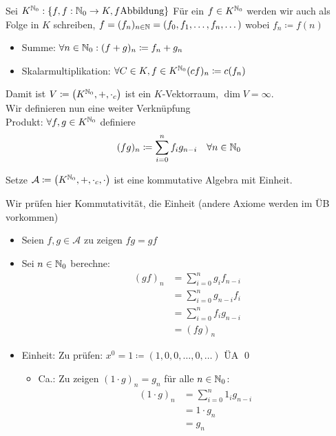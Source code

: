 \begin{subexample}
	Sei $ K^{\mathbb{N} _0} : \left\{ f, f : \mathbb{N} _0 \to K, f \text{Abbildung}  \right\}  $ 
	Für ein $ f \in K^{\mathbb{N} _0}  $ werden wir auch als Folge in $ K $ schreiben, $ f = (f_n)_{n \in \mathbb{N} } = (f_0, f_1, \dotsc, f_n, \dotsc) $ wobei $ f_n \coloneqq f(n) $
	\begin{itemize}
		\item Summe: $ \forall n \in \mathbb{N} _0 : (f + g)_n \coloneqq f_n + g_n $ 
		\item Skalarmultiplikation: $ \forall C \in K, f \in K^{\mathbb{N} _0} (cf)_n \coloneqq c(f_n) $ 
	\end{itemize}
	Damit ist $ V \coloneqq \left(K^{\mathbb{N} _0} , + , \cdot _c\right) $ ist ein $ K $-Vektorraum, $ \dim V = \infty $.\\
	Wir definieren nun eine weiter Verknüpfung\\
	Produkt: $ \forall f, g \in K^{\mathbb{N} _0}  $ definiere
	\[
		(fg)_n \coloneqq  \sum_{i=0}^{n} f_i g_{n - i} \quad \forall n \in \mathbb{N} _0
	\]
\end{subexample}

\begin{subproposition}
	Setze $ \mathcal{A} \coloneqq \left( K^{\mathbb{N} _0} , + , \cdot _c, \cdot  \right)  $ ist eine kommutative Algebra mit Einheit.
\end{subproposition}
\begin{subproof*}
	Wir prüfen hier Kommutativität, die Einheit (andere Axiome werden im ÜB vorkommen)
	\begin{itemize}
		\item Seien $ f, g \in \mathcal{A}  $ zu zeigen $ fg = gf $ 
		\item Sei $ n \in \mathbb{N} _0 $ berechne:
			\begin{align*}
				(gf)_n &= \sum_{i=0}^{n} g_i f_{n - i}  \\
				       &= \sum_{i=0}^{n} g_{n-i} f_i \\
				       &= \sum_{i=0}^{n} f_{i} g_{n - i}  \\
				       &= (fg)_n
			\end{align*}
		\item Einheit: Zu prüfen: $ x^0 = 1 \coloneqq (1, 0, 0, \dotsc, 0, \dotsc) $ ÜA \qed
			\begin{itemize}
				\item Ca.: Zu zeigen $ (1 \cdot g)_n = g_n $ für alle $ n \in \mathbb{N} _0 $:
					\begin{align*}
						(1 \cdot g)_n &= \sum_{i=0}^{n} 1_i g_{n - i}   \\
							      &= 1 \cdot g_n \\
							      &= g_n
					\end{align*}
			\end{itemize}
	\end{itemize}
\end{subproof*}


